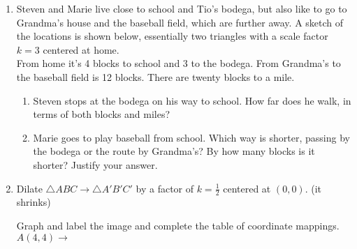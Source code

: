 \documentclass[12pt, twoside]{article}
\begin{document}
\begin{enumerate}
\item Steven and Marie live close to school and Tio's bodega, but also like to go to Grandma's house and the baseball field, which are further away. A sketch of the locations is shown below, essentially two triangles with a scale factor $k=3$ centered at home.\\[0.25cm]
From home it's 4 blocks to school and 3 to the bodega. From Grandma's to the baseball field is 12 blocks. There are twenty blocks to a mile.
\begin{enumerate}
  \item Steven stops at the bodega on his way to school. How far does he walk, in terms of both blocks and miles?
\begin{flushright}
\end{flushright} 
  \item Marie goes to play baseball from school. Which way is shorter, passing by the bodega or the route by Grandma's? By how many blocks is it shorter? Justify your answer.
\end{enumerate}

\newpage
\item Dilate $\triangle ABC \rightarrow \triangle A'B'C'$ by a factor of $k=\frac{1}{2}$ centered at $(0,0)$. (it shrinks)
  \begin{multicols}{2}

    Graph and label the image and complete the table of coordinate mappings.\\[0.5cm]
    $A(4,4) \rightarrow $ \vspace{3cm}
  \end{multicols}


\end{enumerate}
\end{document}
